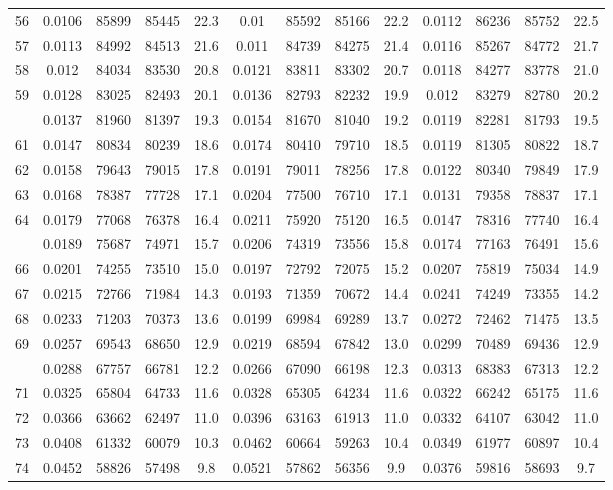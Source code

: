 \documentclass[
  14pt,
]{article}
\begin{document}
\begin{longtable}[t]{lcccccccccccc}
56 & 0.0106 & 85899 & 85445 & 22.3 & 0.01 & 85592 & 85166 & 22.2 & 0.0112 & 86236 & 85752 & 22.5\\
57 & 0.0113 & 84992 & 84513 & 21.6 & 0.011 & 84739 & 84275 & 21.4 & 0.0116 & 85267 & 84772 & 21.7\\
58 & 0.012 & 84034 & 83530 & 20.8 & 0.0121 & 83811 & 83302 & 20.7 & 0.0118 & 84277 & 83778 & 21.0\\
59 & 0.0128 & 83025 & 82493 & 20.1 & 0.0136 & 82793 & 82232 & 19.9 & 0.012 & 83279 & 82780 & 20.2\\
\addlinespace
60 & 0.0137 & 81960 & 81397 & 19.3 & 0.0154 & 81670 & 81040 & 19.2 & 0.0119 & 82281 & 81793 & 19.5\\
61 & 0.0147 & 80834 & 80239 & 18.6 & 0.0174 & 80410 & 79710 & 18.5 & 0.0119 & 81305 & 80822 & 18.7\\
62 & 0.0158 & 79643 & 79015 & 17.8 & 0.0191 & 79011 & 78256 & 17.8 & 0.0122 & 80340 & 79849 & 17.9\\
63 & 0.0168 & 78387 & 77728 & 17.1 & 0.0204 & 77500 & 76710 & 17.1 & 0.0131 & 79358 & 78837 & 17.1\\
64 & 0.0179 & 77068 & 76378 & 16.4 & 0.0211 & 75920 & 75120 & 16.5 & 0.0147 & 78316 & 77740 & 16.4\\
\addlinespace
65 & 0.0189 & 75687 & 74971 & 15.7 & 0.0206 & 74319 & 73556 & 15.8 & 0.0174 & 77163 & 76491 & 15.6\\
66 & 0.0201 & 74255 & 73510 & 15.0 & 0.0197 & 72792 & 72075 & 15.2 & 0.0207 & 75819 & 75034 & 14.9\\
67 & 0.0215 & 72766 & 71984 & 14.3 & 0.0193 & 71359 & 70672 & 14.4 & 0.0241 & 74249 & 73355 & 14.2\\
68 & 0.0233 & 71203 & 70373 & 13.6 & 0.0199 & 69984 & 69289 & 13.7 & 0.0272 & 72462 & 71475 & 13.5\\
69 & 0.0257 & 69543 & 68650 & 12.9 & 0.0219 & 68594 & 67842 & 13.0 & 0.0299 & 70489 & 69436 & 12.9\\
\addlinespace
70 & 0.0288 & 67757 & 66781 & 12.2 & 0.0266 & 67090 & 66198 & 12.3 & 0.0313 & 68383 & 67313 & 12.2\\
71 & 0.0325 & 65804 & 64733 & 11.6 & 0.0328 & 65305 & 64234 & 11.6 & 0.0322 & 66242 & 65175 & 11.6\\
72 & 0.0366 & 63662 & 62497 & 11.0 & 0.0396 & 63163 & 61913 & 11.0 & 0.0332 & 64107 & 63042 & 11.0\\
73 & 0.0408 & 61332 & 60079 & 10.3 & 0.0462 & 60664 & 59263 & 10.4 & 0.0349 & 61977 & 60897 & 10.4\\
74 & 0.0452 & 58826 & 57498 & 9.8 & 0.0521 & 57862 & 56356 & 9.9 & 0.0376 & 59816 & 58693 & 9.7\\

\end{longtable}
\end{document}
